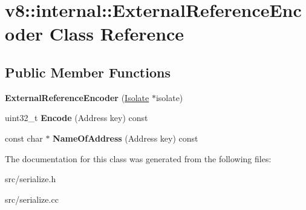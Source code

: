 \hypertarget{classv8_1_1internal_1_1_external_reference_encoder}{}\section{v8\+:\+:internal\+:\+:External\+Reference\+Encoder Class Reference}
\label{classv8_1_1internal_1_1_external_reference_encoder}
\subsection*{Public Member Functions}
\begin{DoxyCompactItemize}
\item 
\hypertarget{classv8_1_1internal_1_1_external_reference_encoder_a6a214ce4f5b34106c1147943237aee2e}{}{\bfseries External\+Reference\+Encoder} (\hyperlink{classv8_1_1internal_1_1_isolate}{Isolate} $\ast$isolate)\label{classv8_1_1internal_1_1_external_reference_encoder_a6a214ce4f5b34106c1147943237aee2e}

\item 
\hypertarget{classv8_1_1internal_1_1_external_reference_encoder_af7f9a581682c421992278061622bbbc5}{}uint32\+\_\+t {\bfseries Encode} (Address key) const \label{classv8_1_1internal_1_1_external_reference_encoder_af7f9a581682c421992278061622bbbc5}

\item 
\hypertarget{classv8_1_1internal_1_1_external_reference_encoder_af0425e12270e349533b55f1afc9cb59d}{}const char $\ast$ {\bfseries Name\+Of\+Address} (Address key) const \label{classv8_1_1internal_1_1_external_reference_encoder_af0425e12270e349533b55f1afc9cb59d}

\end{DoxyCompactItemize}


The documentation for this class was generated from the following files\+:\begin{DoxyCompactItemize}
\item 
src/serialize.\+h\item 
src/serialize.\+cc\end{DoxyCompactItemize}
